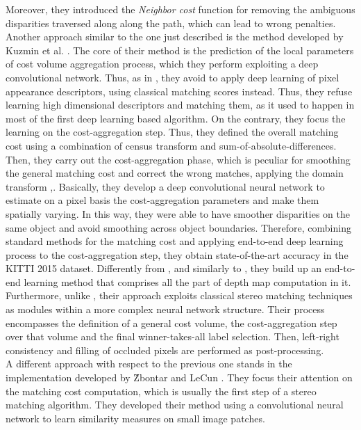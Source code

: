 Moreover, they introduced the \textit{Neighbor cost} function for removing the ambiguous disparities traversed along along the path, which can lead to wrong penalties.\\
Another approach similar to the one just described is the method developed by Kuzmin et al. \cite{Kuzmin2017}. 
The core of their method is the prediction of the local parameters of cost volume aggregation process, which they perform exploiting a deep convolutional network. 
Thus, as in \cite{Seki2017}, they avoid to apply deep learning of pixel appearance descriptors, using classical matching scores instead. 
Thus, they refuse learning high dimensional descriptors and matching them, as it used to happen in most of the first deep learning based algorithm.
On the contrary, they focus the learning on the cost-aggregation step. 
Thus, they defined the overall matching cost using a combination of census transform and sum-of-absolute-differences. 
Then, they carry out the cost-aggregation phase, which is peculiar for smoothing the general matching cost and correct the wrong matches, applying the domain transform \cite{Gastal2011},\cite{Pham2013}.
Basically, they develop a deep convolutional neural network to estimate on a pixel basis the cost-aggregation parameters and make them spatially varying. 
In this way, they were able to have smoother disparities on the same object and avoid smoothing across object boundaries. 
Therefore, combining standard methods for the matching cost and applying end-to-end deep learning process to the cost-aggregation step, they obtain state-of-the-art accuracy in the KITTI 2015 dataset. 
Differently from \cite{Zbontar2016}, \cite{Zbontar2015} and similarly to \cite{Mayer2016}, they build up an end-to-end learning method that comprises all the part of depth map computation in it. 
Furthermore, unlike \cite{Mayer2016}, their approach exploits classical stereo matching techniques as modules within a more complex neural network structure. 
Their process encompasses the definition of a general cost volume, the cost-aggregation step over that volume and the final winner-takes-all label selection. 
Then, left-right consistency and filling of occluded pixels are performed as post-processing.\\
A different approach with respect to the previous one stands in the implementation developed by \^{Z}bontar and LeCun \cite{Zbontar2016}.
They focus their attention on the matching cost computation, which is usually the first step of a stereo matching algorithm. 
They developed their method using a convolutional neural network to learn similarity measures on small image patches. 
